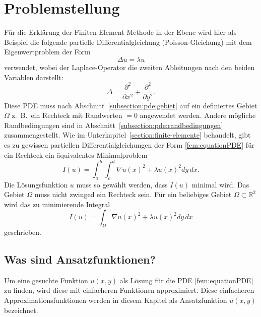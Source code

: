 %
%
%
\section{Problemstellung
\label{fem:section:problemstellung}}
Für die Erklärung der Finiten Element Methode in der Ebene wird
hier als Beispiel die folgende partielle Differentialgleichung
(Poisson-Gleichung) mit dem Eigenwertproblem der Form
\begin{equation}
	\Delta u = \lambda u
	\label{fem:equationPDE}
\end{equation}
verwendet, wobei der Laplace-Operator die zweiten Ableitungen nach
den beiden Variablen darstellt:
\begin{equation}
	\Delta = \frac{\partial ^2}{\partial x^2} + \frac{\partial ^2}{\partial y^2}.
\end{equation} 
Diese PDE muss nach Abschnitt~\ref{subsection:pde:gebiet} auf ein
definiertes Gebiet
$\Omega$  z.~B.~ein Rechteck mit Randwerten $= 0$ angewendet werden.
Andere mögliche Randbedingungen sind in
Abschnitt~\ref{subsection:pde:randbedingungen} zusammengestellt.
Wie im Unterkapitel~\ref{section:finite-elemente} behandelt, gibt
es zu gewissen partiellen Differentialgleichungen der Form
\eqref{fem:equationPDE} für ein Rechteck ein äquivalentes Minimalproblem
\begin{equation}
	I(u) = \int_a^b \int_c^d \nabla u(x)^2 + \lambda u(x)^2 dy \, dx.
	\label{fem:equationMinimalKapt7}
\end{equation}
Die Lösungsfunktion $u$ muss so gewählt werden, dass $I(u)$ minimal wird.
Das Gebiet $\Omega$ muss nicht zwinged ein Rechteck sein.
Für ein beliebiges Gebiet $\Omega \subset \mathbb{R}^2$ wird das
zu minimierende Integral
\begin{equation}
	I(u) = \int_{\Omega} \nabla u(x)^2 + \lambda u(x)^2 dy \, dx
	\label{fem:equationMinimalKapt7Alg}
\end{equation}
geschrieben.

\subsection{Was sind Ansatzfunktionen?}
Um eine gesuchte Funktion $u(x,y)$ als Lösung für die PDE
\eqref{fem:equationPDE} zu finden, wird diese mit einfacheren
Funktionen approximiert.
Diese einfacheren Approximationsfunktionen werden in diesem Kapitel
als Ansatzfunktion $u(x,y)$ bezeichnet.


